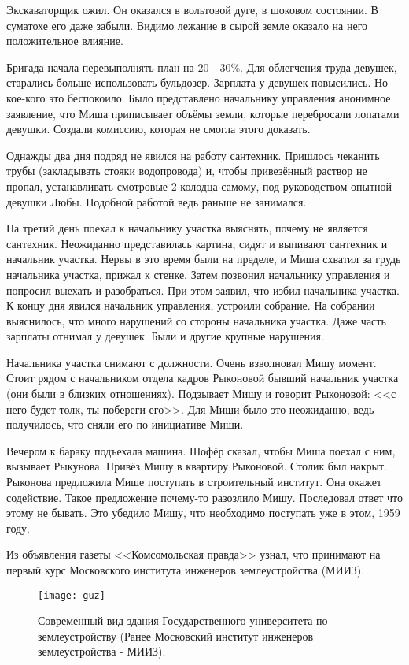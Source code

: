 Экскаваторщик ожил. Он оказался в вольтовой дуге, в шоковом состоянии. В суматохе его даже забыли. Видимо лежание в сырой земле оказало на него положительное влияние. 

Бригада начала перевыполнять план на 20 - 30\%. Для облегчения труда девушек, старались больше использовать бульдозер. Зарплата у девушек повысились. Но кое-кого это беспокоило. Было представлено начальнику управления анонимное заявление, что Миша приписывает объёмы земли, которые перебросали лопатами девушки. Создали комиссию, которая не смогла этого доказать.

Однажды два дня подряд не явился на работу сантехник. Пришлось чеканить трубы (закладывать стояки водопровода) и, чтобы привезённый раствор не пропал, устанавливать смотровые 2 колодца самому, под руководством опытной девушки Любы. Подобной работой ведь раньше не занимался.

На третий день поехал к начальнику участка выяснять, почему не является сантехник. Неожиданно представилась картина, сидят и выпивают сантехник и начальник участка. Нервы в это время были на пределе, и Миша схватил за грудь начальника участка, прижал к стенке. Затем позвонил начальнику управления и попросил выехать и разобраться. При этом заявил, что избил начальника участка. К концу дня явился начальник управления, устроили собрание. На собрании выяснилось, что много нарушений со стороны начальника участка. Даже часть зарплаты отнимал у девушек. Были и другие крупные нарушения.

Начальника участка снимают с должности. Очень взволновал Мишу момент. Стоит рядом с начальником отдела кадров Рыконовой бывший начальник участка (они были в близких отношениях). Подзывает Мишу и говорит Рыконовой: <<с него будет толк, ты побереги его>>. Для Миши было это неожиданно, ведь получилось, что сняли его по инициативе Миши. 

Вечером к бараку подъехала машина. Шофёр сказал, чтобы Миша поехал с ним, вызывает Рыкунова. Привёз Мишу в квартиру Рыконовой. Столик был накрыт. Рыконова предложила Мише поступать в строительный институт. Она окажет содействие. Такое предложение почему-то разозлило Мишу. Последовал ответ что этому не бывать. Это убедило Мишу, что необходимо поступать уже в этом, 1959 году.

Из объявления газеты <<Комсомольская правда>> узнал, что принимают на первый курс Московского института инженеров землеустройства (МИИЗ).

\begin{wrapfigure}{O}{.4\textwidth}
\centering
\texttt{[image: guz]}
\caption[{Современный вид здания Государственного университета по землеустройству (Ранее Московский институт инженеров землеустройства - МИИЗ).}]{Современный вид здания Государственного университета по землеустройству (Ранее Московский институт инженеров землеустройства - МИИЗ)\footnotemark.}
\label{fig:guz}
\end{wrapfigure}

